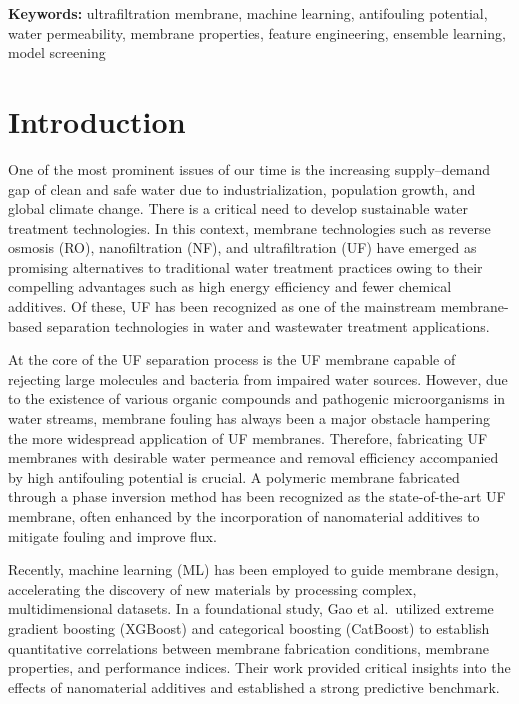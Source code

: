 \documentclass[11pt]{article}
\begin{document}
\vspace{1em}
\noindent\textbf{Keywords:} ultrafiltration membrane, machine learning, antifouling potential, water permeability, membrane properties, feature engineering, ensemble learning, model screening

\section{Introduction}

One of the most prominent issues of our time is the increasing supply--demand gap of clean and safe water due to industrialization, population growth, and global climate change. There is a critical need to develop sustainable water treatment technologies. In this context, membrane technologies such as reverse osmosis (RO), nanofiltration (NF), and ultrafiltration (UF) have emerged as promising alternatives to traditional water treatment practices owing to their compelling advantages such as high energy efficiency and fewer chemical additives. Of these, UF has been recognized as one of the mainstream membrane-based separation technologies in water and wastewater treatment applications.

At the core of the UF separation process is the UF membrane capable of rejecting large molecules and bacteria from impaired water sources. However, due to the existence of various organic compounds and pathogenic microorganisms in water streams, membrane fouling has always been a major obstacle hampering the more widespread application of UF membranes. Therefore, fabricating UF membranes with desirable water permeance and removal efficiency accompanied by high antifouling potential is crucial. A polymeric membrane fabricated through a phase inversion method has been recognized as the state-of-the-art UF membrane, often enhanced by the incorporation of nanomaterial additives to mitigate fouling and improve flux.

Recently, machine learning (ML) has been employed to guide membrane design, accelerating the discovery of new materials by processing complex, multidimensional datasets. In a foundational study, Gao et al.\ utilized extreme gradient boosting (XGBoost) and categorical boosting (CatBoost) to establish quantitative correlations between membrane fabrication conditions, membrane properties, and performance indices.\cite{gao2023} Their work provided critical insights into the effects of nanomaterial additives and established a strong predictive benchmark.
\end{document}
